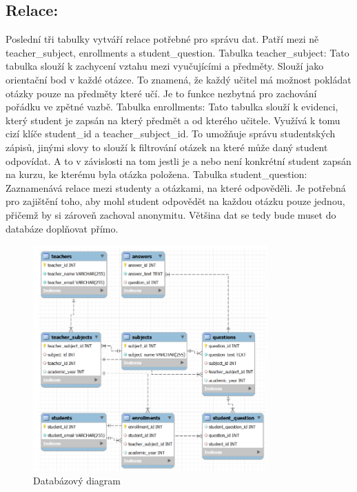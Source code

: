 \documentclass[11pt,a4paper,twoside,openright]{report}
\begin{document}
{\subsection{Relace:}
Poslední tři tabulky vytváří relace potřebné pro správu dat. Patří mezi ně teacher\_subject, enrollments a student\_question.
Tabulka teacher\_subject:
Tato tabulka slouží k zachycení vztahu mezi vyučujícími a předměty. Slouží jako orientační bod v každé otázce. To znamená, že každý učitel má možnost pokládat otázky pouze na předměty které učí. Je to funkce nezbytná pro zachování pořádku ve zpětné vazbě.
Tabulka enrollments:
Tato tabulka slouží k evidenci, který student je zapsán na který předmět a od kterého učitele. Využívá k tomu cizí klíče student\_id a teacher\_subject\_id. To umožňuje správu studentských zápisů, jinými slovy to slouží k filtrování otázek na které může daný student odpovídat. A to v závislosti na tom jestli je a nebo není konkrétní student zapsán na kurzu, ke kterému byla otázka položena.
Tabulka student\_question:
Zaznamenává relace mezi studenty a otázkami, na které odpověděli. Je potřebná pro zajištění toho, aby mohl student odpovědět na každou otázku pouze jednou, přičemž by si zároveň zachoval anonymitu.
Většina dat se tedy bude muset do databáze doplňovat přímo.


\begin{figure}[h]
  \centering
  \includegraphics[width=0.8\textwidth]{database_structure}
  \caption{Databázový diagram}
  \label{fig:obrazek}
\end{figure}



}
\end{document}
